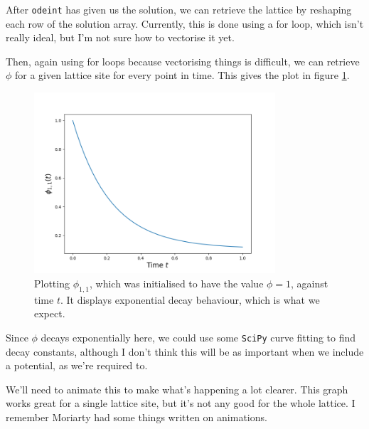 \documentclass{article}
\begin{document}
After \texttt{odeint} has given us the solution, we can retrieve the lattice by reshaping each row of the solution array. Currently, this is done using a for loop, which isn't really ideal, but I'm not sure how to vectorise it yet.

Then, again using for loops because vectorising things is difficult, we can retrieve $\phi$ for a given lattice site for every point in time. This gives the plot in figure \ref{first phi plot}.

\begin{figure}
	\centering
	\includegraphics[width=0.8\textwidth]{phi_plot.png}
	\caption{\label{first phi plot}Plotting $\phi_{1,1}$, which was initialised to have the value $\phi=1$, against time $t$. It displays exponential decay behaviour, which is what we expect.}
\end{figure}

Since $\phi$ decays exponentially here, we could use some \texttt{SciPy} curve fitting to find decay constants, although I don't think this will be as important when we include a potential, as we're required to.

\medskip

We'll need to animate this to make what's happening a lot clearer. This graph works great for a single lattice site, but it's not any good for the whole lattice. I remember Moriarty had some things written on animations.
\end{document}
